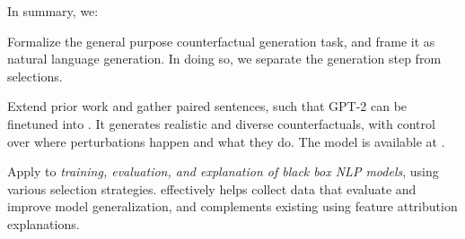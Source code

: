 In summary, we:
\begin{compactenum}
\item  Formalize the general purpose counterfactual generation task, and frame it as natural language generation. In doing so, we separate the generation step from selections.
\item Extend prior work and gather paired sentences, such that GPT-2 can be finetuned into \sysname. 
It generates realistic and diverse counterfactuals, with control over where perturbations happen and what they do.
The model is available at \modelurl.
\item Apply \sysname to \emph{training, evaluation, and explanation of black box NLP models}, using various selection strategies.
\sysname effectively helps collect data that evaluate and improve model generalization, and complements existing using feature attribution explanations.
\end{compactenum}


